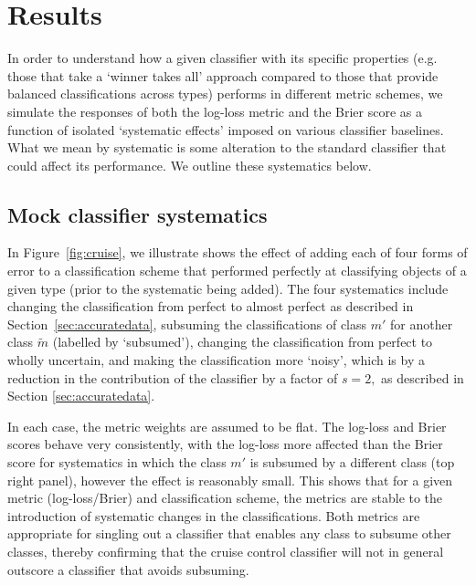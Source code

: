 \section{Results}
\label{sec:results}
In order to understand how a given classifier with its specific properties (e.g. those that take a `winner takes all' approach compared to those that provide balanced classifications across types) performs in different metric schemes, we simulate the responses of both the log-loss metric and the Brier score as a function of isolated `systematic effects' imposed on various classifier baselines. What we mean by systematic is some alteration to the standard classifier that could affect its performance.  We outline these systematics below.

\subsection{Mock classifier systematics}
\label{sec:mockresults}
In Figure~\ref{fig:cruise}, we illustrate shows the effect of adding each of four forms of error to a classification scheme that performed perfectly at classifying objects of a given type (prior to the systematic being added). The four systematics include changing the classification from perfect to almost perfect as described in Section~\ref{sec:accuratedata},  subsuming the classifications of class $m'$ for another class $\tilde{m}$ (labelled by `subsumed'), changing the classification from perfect to wholly uncertain, and making the classification more `noisy', which is by a reduction in the contribution of the classifier by a factor of $s=2,$ as described in Section \ref{sec:accuratedata}.

In each case, the metric weights are assumed to be flat.  The log-loss and Brier scores behave very consistently, with the log-loss more affected than the Brier score for systematics in which the class $m'$ is subsumed by a different class (top right panel), however the effect is reasonably small. This shows that for a given metric (log-loss/Brier) and classification scheme, the metrics are stable to the introduction of systematic changes in the classifications.
Both metrics are appropriate for singling out a classifier that enables any class to subsume other classes, thereby confirming that the cruise control classifier will not in general outscore a classifier that avoids subsuming.

